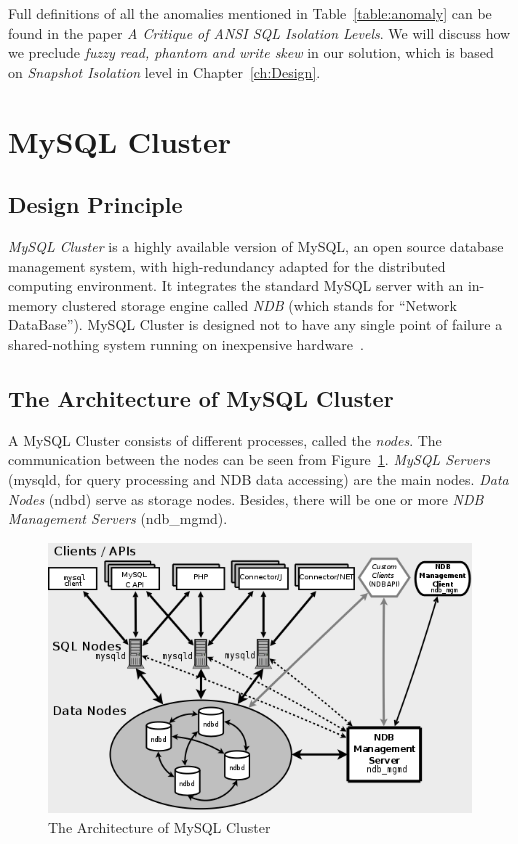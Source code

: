 \noindent Full definitions of all the anomalies mentioned in Table~\ref{table:anomaly} can be found in the paper \textit{A Critique of ANSI SQL Isolation Levels}. We will discuss how we preclude \textit{fuzzy read, phantom and write skew} in our solution, which is based on \textit{Snapshot Isolation} level in Chapter~\ref{ch:Design}.
\section{MySQL Cluster}

\subsection{Design Principle}
\textit{MySQL Cluster} is a highly available version of MySQL, an open source database management system, with high-redundancy adapted for the distributed computing environment. It integrates the standard MySQL server with an in-memory clustered storage engine called \textit{NDB} (which stands for “Network DataBase”). MySQL Cluster is designed not to have any single point of failure a shared-nothing system running on inexpensive hardware~\cite{mysqlcluster}.

\subsection{The Architecture of MySQL Cluster}
\noindent A MySQL Cluster consists of different processes, called the \textit{nodes}. The communication between the nodes can be seen from Figure~\ref{fig:mysqlclusterarchitecture}. \textit{MySQL Servers} (mysqld, for query processing and NDB data accessing) are the main nodes. \textit{Data Nodes} (ndbd) serve as storage nodes. Besides, there will be one or more \textit{NDB Management Servers} (ndb\_mgmd).

\begin{figure}[h!]
	\centering
	\includegraphics[scale=0.4]{figs/mysqlcluster.png}
	\caption{The Architecture of MySQL Cluster \protect \cite{mysqlcluster}}
	\label{fig:mysqlclusterarchitecture}
\end{figure}

